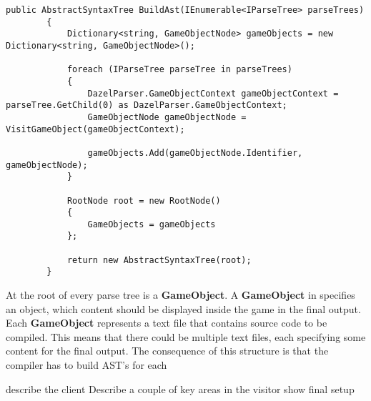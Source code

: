 \begin{lstlisting}[caption={The BuildAst method}, label={lst:BuildAstMethod},escapechar=|]
    public AbstractSyntaxTree BuildAst(IEnumerable<IParseTree> parseTrees)
        {
            Dictionary<string, GameObjectNode> gameObjects = new Dictionary<string, GameObjectNode>();
            
            foreach (IParseTree parseTree in parseTrees)
            {
                DazelParser.GameObjectContext gameObjectContext = parseTree.GetChild(0) as DazelParser.GameObjectContext;
                GameObjectNode gameObjectNode = VisitGameObject(gameObjectContext);
                
                gameObjects.Add(gameObjectNode.Identifier, gameObjectNode);
            }

            RootNode root = new RootNode()
            {
                GameObjects = gameObjects
            };
            
            return new AbstractSyntaxTree(root);
        }
\end{lstlisting}

At the root of every parse tree is a \textbf{GameObject}. A \textbf{GameObject} in \dazel{} specifies an object, which content should be displayed inside the game in the final output. Each \textbf{GameObject} represents a text file that contains source code to be compiled. This means that there could be multiple text files, each specifying some content for the final output. The consequence of this structure is that the compiler has to build AST's for each 









describe the client
Describe a couple of key areas in the visitor
show final setup
